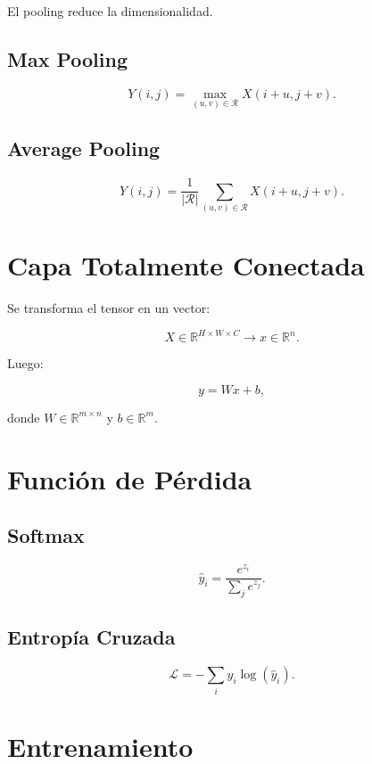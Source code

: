 \documentclass[
  letterpaper,
  DIV=11,
  numbers=noendperiod]{scrartcl}
\begin{document}
El pooling reduce la dimensionalidad.

\subsection{Max Pooling}\label{max-pooling}

\[
Y(i,j) = \max_{(u,v)\in \mathcal{R}} X(i+u, j+v).
\]

\subsection{Average Pooling}\label{average-pooling}

\[
Y(i,j) = \frac{1}{|\mathcal{R}|} \sum_{(u,v)\in \mathcal{R}} X(i+u, j+v).
\]

\section{Capa Totalmente Conectada}\label{capa-totalmente-conectada}

Se transforma el tensor en un vector:

\[
X \in \mathbb{R}^{H \times W \times C} \rightarrow x \in \mathbb{R}^{n}.
\]

Luego:

\[
y = Wx + b,
\]

donde \(W \in \mathbb{R}^{m \times n}\) y \(b \in \mathbb{R}^{m}\).

\section{Función de Pérdida}\label{funciuxf3n-de-puxe9rdida}

\subsection{Softmax}\label{softmax}

\[
\hat{y}_i = \frac{e^{z_i}}{\sum_{j} e^{z_j}}.
\]

\subsection{Entropía Cruzada}\label{entropuxeda-cruzada}

\[
\mathcal{L} = -\sum_{i} y_i \log(\hat{y}_i).
\]

\section{Entrenamiento}\label{entrenamiento}
\end{document}
